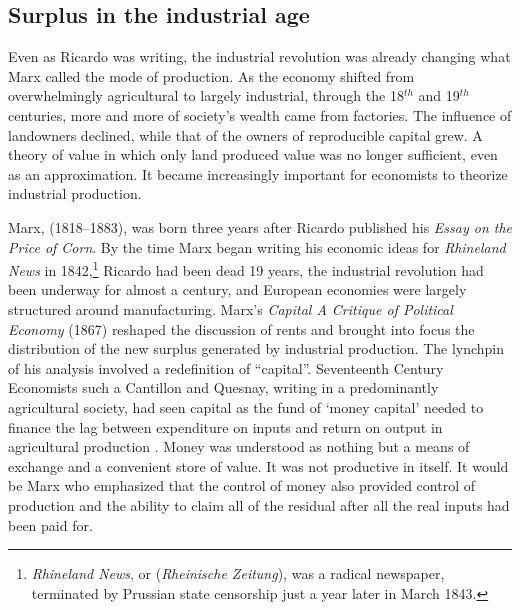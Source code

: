 \subsection{Surplus in the industrial age}

Even as Ricardo was writing, the industrial revolution was already changing what Marx called the mode of production.  As the economy shifted  from overwhelmingly agricultural to largely industrial,  through %
the 18$^{th}$  and 19$^{th}$ centuries, more and more of society's wealth came from %
factories. %
The influence of landowners declined, while that of the owners of \gls{reproducible capital} grew. A theory of value in which only land produced value was no longer sufficient, even as an approximation.  It became increasingly important for economists to theorize industrial production.

Marx, (1818--1883), was born three years after Ricardo published his \textit{Essay on the Price of Corn}. 
By the time Marx began writing his economic ideas for \textit{Rhineland News} in 1842,\footnote{\textit{Rhineland News}, or (\textit{Rheinische Zeitung}), was a radical newspaper, terminated by Prussian state censorship just a year later in March 1843.} Ricardo had been dead 19 years, the industrial revolution had been underway for almost a century, and European economies were largely structured around manufacturing. Marx's \emph{Capital A Critique of Political Economy} (1867) \cite{marxKapitalCritiquePolitical1959} reshaped the discussion of rents  and brought into focus the distribution of the new surplus generated by industrial production. The lynchpin of his analysis involved a redefinition of ``capital''.
Seventeenth Century Economists such a Cantillon and Quesnay,  writing in a predominantly agricultural society, had seen  capital as the fund of ‘money capital’ needed  to finance the lag between expenditure on inputs and return on output  in agricultural production \cite{cannanEarlyHistoryTerm1921, royEvolutionConceptCapital2009}. Money was understood as nothing but a means of exchange and a convenient store of value. It was not productive in itself. It would be Marx who emphasized that the control of money also provided control of production and the ability to claim all of the residual after all the real inputs had been paid for. 

